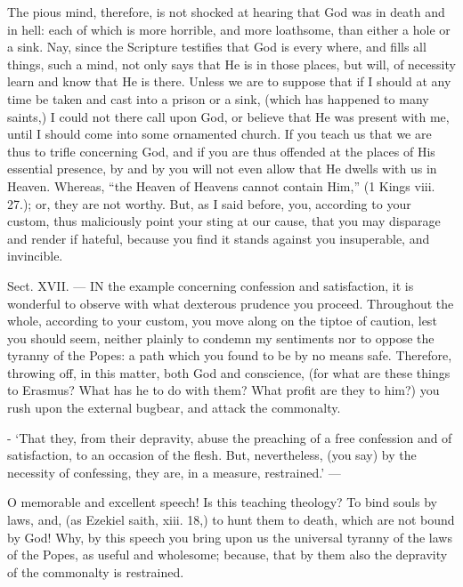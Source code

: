 The pious mind, therefore, is not shocked at hearing that God was in death and in hell: each of which is more horrible, and more loathsome, than either a hole or a sink. Nay, since the Scripture testifies that God is every where, and fills all things, such a mind, not only says that He is in those places, but will, of necessity learn and know that He is there. Unless we are to suppose that if I should at any time be taken and cast into a prison or a sink, (which has happened to many saints,) I could not there call upon God, or believe that He was present with me, until I should come into some ornamented church. If you teach us that we are thus to trifle concerning God, and if you are thus offended at the places of His essential presence, by and by you will not even allow that He dwells with us in Heaven. Whereas, “the Heaven of Heavens cannot contain Him,” (1 Kings viii. 27.); or, they are not worthy. But, as I said before, you, according to your custom, thus maliciously point your sting at our cause, that you may disparage and render if hateful, because you find it stands against you insuperable, and invincible.


Sect. XVII. — IN the example concerning confession and satisfaction, it is wonderful to observe with what dexterous prudence you proceed. Throughout the whole, according to your custom, you move along on the tiptoe of caution, lest you should seem, neither plainly to condemn my sentiments nor to oppose the tyranny of the Popes: a path which you found to be by no means safe. Therefore, throwing off, in this matter, both God and conscience, (for what are these things to Erasmus? What has he to do with them? What profit are they to him?) you rush upon the external bugbear, and attack the commonalty.

- ‘That they, from their depravity, abuse the preaching of a free confession and of satisfaction, to an occasion of the flesh. But, nevertheless, (you say) by the necessity of confessing, they are, in a measure, restrained.’ —

O memorable and excellent speech! Is this teaching theology? To bind souls by laws, and, (as Ezekiel saith, xiii. 18,) to hunt them to death, which are not bound by God! Why, by this speech you bring upon us the universal tyranny of the laws of the Popes, as useful and wholesome; because, that by them also the depravity of the commonalty is restrained.


